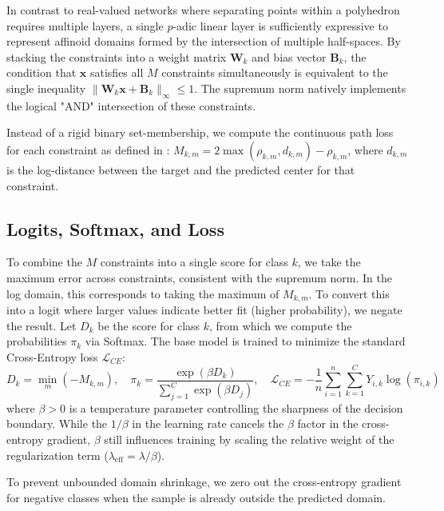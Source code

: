 In contrast to real-valued networks where separating points within a polyhedron requires multiple layers, a single $p$-adic linear layer is sufficiently expressive to represent affinoid domains formed by the intersection of multiple half-spaces. By stacking the constraints into a weight matrix $\mathbf{W}_k$ and bias vector $\mathbf{B}_k$, the condition that $\mathbf{x}$ satisfies all $M$ constraints simultaneously is equivalent to the single inequality $\|\mathbf{W}_k \mathbf{x} + \mathbf{B}_k\|_\infty \le 1$. The supremum norm natively implements the logical "AND" intersection of these constraints.

Instead of a rigid binary set-membership, we compute the continuous path loss for each constraint as defined in : $M_{k,m} = 2 \max(\rho_{k,m}, d_{k,m}) - \rho_{k,m}$, where $d_{k,m}$ is the log-distance between the target and the predicted center for that constraint.


\subsection{Logits, Softmax, and Loss}
To combine the $M$ constraints into a single score for class $k$, we take the maximum error across constraints, consistent with the supremum norm. In the log domain, this corresponds to taking the maximum of $M_{k,m}$. To convert this into a logit where larger values indicate better fit (higher probability), we negate the result. Let $D_k$ be the score for class $k$, from which we compute the probabilities $\pi_k$ via Softmax. The base model is trained to minimize the standard Cross-Entropy loss $\mathcal{L}_{CE}$:
\begin{equation}
    D_k = \min_{m} (-M_{k,m}), \quad \pi_k = \frac{\exp(\beta D_k)}{\sum_{j=1}^C \exp(\beta D_j)}, \quad \mathcal{L}_{CE} = -\frac{1}{n} \sum_{i=1}^n \sum_{k=1}^C Y_{i,k} \log(\pi_{i,k})
\end{equation}
where $\beta > 0$ is a temperature parameter controlling the sharpness of the decision boundary. While the $1/\beta$ in the learning rate cancels the $\beta$ factor in the cross-entropy gradient, $\beta$ still influences training by scaling the relative weight of the regularization term ($\lambda_{\text{eff}} = \lambda / \beta$).

To prevent unbounded domain shrinkage, we zero out the cross-entropy gradient for negative classes when the sample is already outside the predicted domain.

